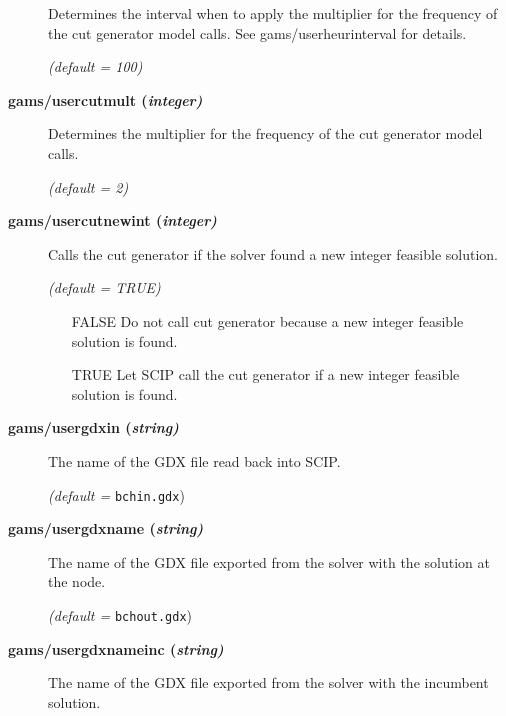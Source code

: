 \begin{description}
Determines the interval when to apply the multiplier for the frequency of the cut generator model calls.
See gams/userheurinterval for details.

\textsl{(default = 100)}

\item[\label{scipusercutmult}\hypertarget{scipusercutmult}
{\textbf{gams/usercutmult (\slshape{integer})}}]\hspace{1.0in}

Determines the multiplier for the frequency of the cut generator model calls.

\textsl{(default = 2)}

\item[\label{scipusercutnewint}\hypertarget{scipusercutnewint}
{\textbf{gams/usercutnewint (\slshape{integer})}}]\hspace{1.0in}

Calls the cut generator if the solver found a new integer feasible solution.

\textsl{(default = TRUE)}
\begin{itemize}
\item[FALSE] Do not call cut generator because a new integer feasible solution is found.
\item[TRUE] Let SCIP call the cut generator if a new integer feasible solution is found.
\end{itemize}

\item[\label{scipusergdxin}\hypertarget{scipusergdxin}
{\textbf{gams/usergdxin (\slshape{string})}}]\hspace{1.0in}

The name of the GDX file read back into SCIP.

\textsl{(default =} \verb=bchin.gdx=)

\item[\label{scipusergdxname}\hypertarget{scipusergdxname}
{\textbf{gams/usergdxname (\slshape{string})}}]\hspace{1.0in}

The name of the GDX file exported from the solver with the solution at the node.

\textsl{(default =} \verb=bchout.gdx=)

\item[\label{scipusergdxnameinc}\hypertarget{scipusergdxnameinc}
{\textbf{gams/usergdxnameinc (\slshape{string})}}]\hspace{1.0in}

The name of the GDX file exported from the solver with the incumbent solution.


\end{description}
